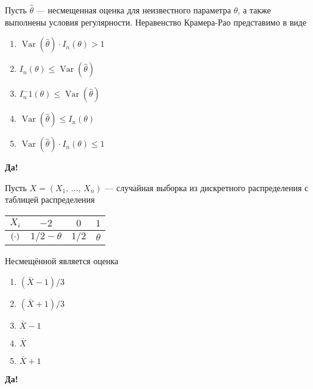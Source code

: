 \documentclass[t]{beamer}
\DeclareMathOperator{\Var}{Var}
\let\P\relax
\DeclareMathOperator{\P}{\mathbb{P}}
\begin{document}
 \begin{frame} \label{25-Yes} 
\begin{block}{25} 

  Пусть $\hat{\theta}$ — несмещенная оценка для неизвестного параметра $\theta$, а также выполнены условия регулярности. Неравенство Крамера-Рао представимо в виде


 \end{block} 
\begin{enumerate} 
\item[] \hyperlink{25-No}{\beamergotobutton{} $\Var(\hat\theta) \cdot I_n(\theta) > 1$}
\item[] \hyperlink{25-No}{\beamergotobutton{} $I_n(\theta) \leq \Var(\hat\theta)$}
\item[] \hyperlink{25-Yes}{\beamergotobutton{} $I_n^-1(\theta) \leq \Var(\hat\theta)$}
\item[] \hyperlink{25-No}{\beamergotobutton{} $\Var(\hat\theta) \leq I_n(\theta)$}
\item[] \hyperlink{25-No}{\beamergotobutton{} $\Var(\hat\theta) \cdot I_n(\theta) \leq 1$}
\end{enumerate} 

 \textbf{Да!} 
 \hyperlink{26}{}\end{frame} 


 \begin{frame} \label{26-Yes} 
\begin{block}{26} 

    Пусть $X = (X_1, \, \ldots, \, X_n)$ — случайная выборка из дискретного распределения с таблицей распределения

\begin{center}
	\begin{tabular}{cccc}
		\toprule
		$X_i$  & $-2$    & $0$      & $1$  \\
		\midrule
		$\P(\cdot)$        & $1/2 - \theta$      & $1/2$    & $\theta$  \\
		\bottomrule
	\end{tabular}
\end{center}

Несмещённой является оценка


 \end{block} 
\begin{enumerate} 
\item[] \hyperlink{26-No}{\beamergotobutton{} $(\bar{X} - 1) / 3$}
\item[] \hyperlink{26-Yes}{\beamergotobutton{} $(\bar{X} + 1) / 3$}
\item[] \hyperlink{26-No}{\beamergotobutton{} $\bar{X} - 1$}
\item[] \hyperlink{26-No}{\beamergotobutton{} $\bar{X}$}
\item[] \hyperlink{26-No}{\beamergotobutton{} $\bar{X} + 1$}
\end{enumerate} 

 \textbf{Да!} 
 \hyperlink{27}{}\end{frame} 
\end{document}

